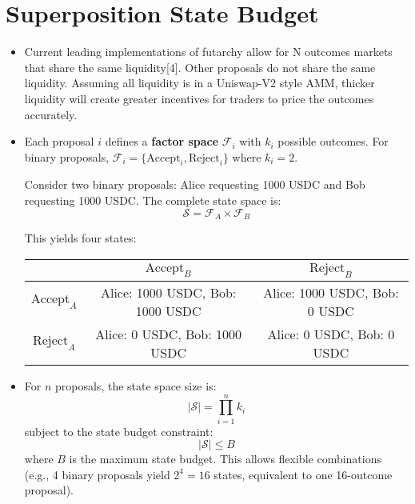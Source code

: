 \documentclass{article}
\begin{document}
\section{Superposition State Budget}
\begin{itemize}
    \item Current leading implementations of futarchy allow for N outcomes markets that share the same liquidity[4]. Other proposals do not share the same liquidity. Assuming all liquidity is in a Uniswap-V2 style AMM, thicker liquidity will create greater incentives for traders to price the outcomes accurately.
    
    \item Each proposal $i$ defines a \textbf{factor space} $\mathcal{F}_i$ with $k_i$ possible outcomes. For binary proposals, $\mathcal{F}_i = \{\text{Accept}_i, \text{Reject}_i\}$ where $k_i = 2$.
    
    Consider two binary proposals: Alice requesting 1000 USDC and Bob requesting 1000 USDC. The complete state space is:
    \begin{equation}
    \mathcal{S} = \mathcal{F}_A \times \mathcal{F}_B
    \end{equation}
    
    This yields four states:
    \begin{center}
    \begin{tabular}{|c|c|c|}
    \hline
    & $\text{Accept}_B$ & $\text{Reject}_B$ \\
    \hline
    $\text{Accept}_A$ & Alice: 1000 USDC, Bob: 1000 USDC & Alice: 1000 USDC, Bob: 0 USDC \\
    \hline
    $\text{Reject}_A$ & Alice: 0 USDC, Bob: 1000 USDC & Alice: 0 USDC, Bob: 0 USDC \\
    \hline
    \end{tabular}
    \end{center}
    
    \item For $n$ proposals, the state space size is:
    \begin{equation}
    |\mathcal{S}| = \prod_{i=1}^{n} k_i
    \end{equation}
    subject to the state budget constraint:
    \begin{equation}
    |\mathcal{S}| \leq B
    \end{equation}
    where $B$ is the maximum state budget. This allows flexible combinations (e.g., 4 binary proposals yield $2^4 = 16$ states, equivalent to one 16-outcome proposal).
    

\end{itemize}
\end{document}
